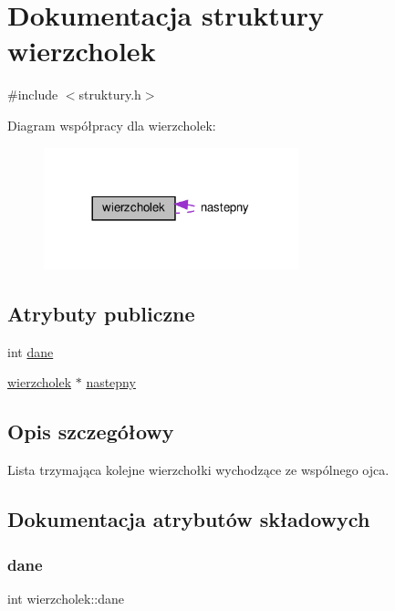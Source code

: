 \hypertarget{structwierzcholek}{}\section{Dokumentacja struktury wierzcholek}
\label{structwierzcholek}


{\ttfamily \#include $<$struktury.\+h$>$}



Diagram współpracy dla wierzcholek\+:\nopagebreak
\begin{figure}[H]
\begin{center}
\leavevmode
\includegraphics[width=209pt]{structwierzcholek__coll__graph}
\end{center}
\end{figure}
\subsection*{Atrybuty publiczne}
\begin{DoxyCompactItemize}
\item 
int \hyperlink{structwierzcholek_a05773e7b31c7c25b3458a990ec92eb5c}{dane}
\item 
\hyperlink{structwierzcholek}{wierzcholek} $\ast$ \hyperlink{structwierzcholek_afc6e289ba34df6780a3b73f8f189a878}{nastepny}
\end{DoxyCompactItemize}


\subsection{Opis szczegółowy}
Lista trzymająca kolejne wierzchołki wychodzące ze wspólnego ojca. 

\subsection{Dokumentacja atrybutów składowych}
\mbox{\label{structwierzcholek_a05773e7b31c7c25b3458a990ec92eb5c}} 
\subsubsection{\texorpdfstring{dane}{dane}}
{\footnotesize\ttfamily int wierzcholek\+::dane}

